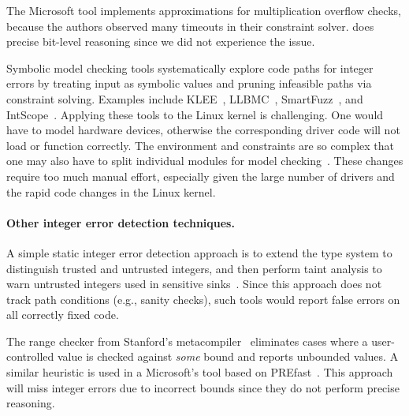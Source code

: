 The Microsoft tool implements approximations for multiplication
overflow checks, because the authors observed many timeouts in their
constraint solver.  \sys does precise bit-level reasoning
since we did not experience the issue.



Symbolic model checking tools systematically explore code paths
for integer errors by treating input as symbolic values and pruning
infeasible paths via constraint solving.  Examples include
KLEE~\cite{cadar:klee},
LLBMC~\cite{llbmc},
SmartFuzz~\cite{molnar:catchconv},
and
IntScope~\cite{intscope}.
Applying these tools to the Linux kernel is challenging.  One would
have to model hardware devices, otherwise the corresponding driver
code will not load or function correctly.  The environment and
constraints are so complex that one may also have to split
individual modules for model checking~\cite{engler:vs}.  These
changes require too much manual effort, especially given the
large number of drivers and the rapid code changes in the Linux
kernel.


\paragraph{Other integer error detection techniques.}
A simple static integer error detection approach is to extend the
type system to distinguish trusted and untrusted integers, and then
perform taint analysis to warn untrusted integers used in sensitive
sinks~\cite{cqual, lclint}.  Since this approach does not track
path conditions (e.g., sanity checks), such tools would report false
errors on all correctly fixed code.

The range checker from Stanford's metacompiler~\cite{range-checker}
eliminates cases where a user-controlled value is checked against
\emph{some} bound and reports unbounded values.  A similar heuristic
is used in a Microsoft's tool based on PREfast~\cite{prefast}.  This
approach will miss integer errors due to incorrect bounds since
they do not perform precise reasoning.

